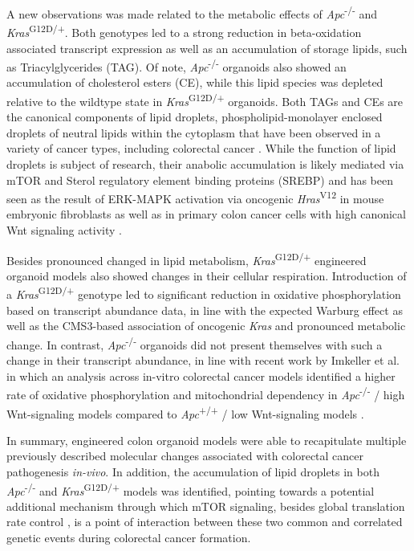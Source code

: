 \begin{flushleft}
A new observations was made related to the metabolic effects of \textit{Apc}\textsuperscript{-/-} and \textit{Kras}\textsuperscript{G12D/+}. Both genotypes led to a strong reduction in beta-oxidation associated transcript expression as well as an accumulation of storage lipids, such as Triacylglycerides (TAG). Of note, \textit{Apc}\textsuperscript{-/-} organoids also showed an accumulation of cholesterol esters (CE), while this lipid species was depleted relative to the wildtype state in \textit{Kras}\textsuperscript{G12D/+} organoids. Both TAGs and CEs are the canonical components of lipid droplets, phospholipid-monolayer enclosed droplets of neutral lipids within the cytoplasm that have been observed in a variety of cancer types, including colorectal cancer \parencite{cruzLipidDropletsPlatforms2020, acciolyLipidBodiesAre2008}. While the function of lipid droplets is subject of research, their anabolic accumulation is likely mediated via mTOR and Sterol regulatory element binding proteins (SREBP) \parencite{cruzLipidDropletsPlatforms2020} and has been seen as the result of ERK-MAPK activation via oncogenic \textit{Hras}\textsuperscript{V12} in mouse embryonic fibroblasts \parencite{cruzCellCycleProgression2019} as well as in primary colon cancer cells with high canonical Wnt signaling activity \parencite{tirinatoLipidDropletsNew2015}.
\par

Besides pronounced changed in lipid metabolism, \textit{Kras}\textsuperscript{G12D/+} engineered organoid models also showed changes in their cellular respiration. Introduction of a \textit{Kras}\textsuperscript{G12D/+} genotype led to significant reduction in oxidative phosphorylation based on transcript abundance data, in line with the expected Warburg effect \parencite{deberardinisWeNeedTalk2020} as well as the CMS3-based association of oncogenic \textit{Kras} and pronounced metabolic change. In contrast, \textit{Apc}\textsuperscript{-/-} organoids did not present themselves with such a change in their transcript abundance, in line with recent work by Imkeller et al. in which an analysis across in-vitro colorectal cancer models identified a higher rate of oxidative phosphorylation and mitochondrial dependency in \textit{Apc}\textsuperscript{-/-} / high Wnt-signaling models compared to \textit{Apc}\textsuperscript{+/+} / low Wnt-signaling models \parencite{imkellerMetabolicBalanceColorectal2022}. 
\par

In summary, engineered colon organoid models were able to recapitulate multiple previously described molecular changes associated with colorectal cancer pathogenesis \textit{in-vivo}. In addition, the accumulation of lipid droplets in both \textit{Apc}\textsuperscript{-/-} and \textit{Kras}\textsuperscript{G12D/+} models was identified, pointing towards a potential additional mechanism through which mTOR signaling, besides global translation rate control \parencite{smitDriverMutationsAdenomacarcinoma2020}, is a point of interaction between these two common and correlated genetic events during colorectal cancer formation. 


\end{flushleft}
